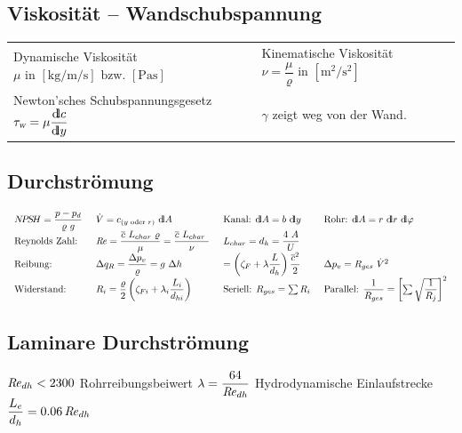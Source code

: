 \subsection{Viskosität -- Wandschubspannung}
	\begin{center}
		\setlength{\tabcolsep}{2em} %
		\begin{tabular}{ll}
		      Dynamische Viskosität $ \mu \text{ in } \left[\unit{\kg\per\m\per\s}\right] \text{ bzw. } \left[\unit{\Pa\s}\right] $
			& Kinematische Viskosität $ \nu = \dfrac{\mu}{\varrho} \text{ in } \left[\unit{\m\squared \per\s\squared}\right] $
			\\
			  Newton'sches Schubspannungsgesetz $ \tau_{\textsl{w}} = \mu \dfrac{{\operatorname{d\!l}} c}{{\operatorname{d\!l}} y} $
			& $\gamma$ zeigt weg von der Wand.
		\end{tabular}
	\end{center}

\subsection{Durchströmung}
	\setlength{\abovedisplayskip}{-15pt}
	\[ \arraycolsep=0.7em
		\begin{array}{llll}
			N\!P\!S\!H = \dfrac{p - p_d}{\varrho\ g} & \dot{V} = c_{(y \text{ oder } r)} \ \dd A                                                    & \text{Kanal: } \dd A = b\ \dd y                                          & \text{Rohr: } \dd A = r\ \dd r\ \dd\varphi \\
			\text{Reynolds Zahl:}                    & \Reyn = \dfrac{\overline{c}\ L_{char}\ \varrho}{\mu} = \dfrac{\overline{c}\ L_{char}\ }{\nu} & L_{char} = d_h = \dfrac{4\ A}{U}                                         &                                             \\
			\text{Reibung:}                          & \Delta q_R = \dfrac{\Delta p_v}{\varrho} = g\ \Delta h                                       & = \left( \zeta_F + \lambda \dfrac{L}{d_h} \right) \dfrac{\overline{c}^2}{2} & \Delta p_v = R_{ges}\ \dot{V}^2             \\
			\text{Widerstand:}                       & R_i = \dfrac{\varrho}{2}  \left( \zeta_{Fi} + \lambda_i \dfrac{L_i}{d_{hi}}\right)              & \text{Seriell: } R_{ges} = \sum R_i  & \text{Parallel: } \dfrac{1}{R_{ges}} = \left[\sum\sqrt{\dfrac{1}{R_j}}\right]^2
		\end{array}
	\]
\subsection{Laminare Durchströmung}
	$ \operatorname{\mathit{R\kern-.10em e}}_{dh} < 2300 $ \quad	Rohrreibungsbeiwert $ \lambda = \dfrac{64}{\operatorname{\mathit{R\kern-.10em e}}_{dh}} $ \qquad	Hydrodynamische Einlaufstrecke $ \dfrac{L_e}{d_h} = \num{0,06} \operatorname{\mathit{R\kern-.10em e}}_{dh}  $

